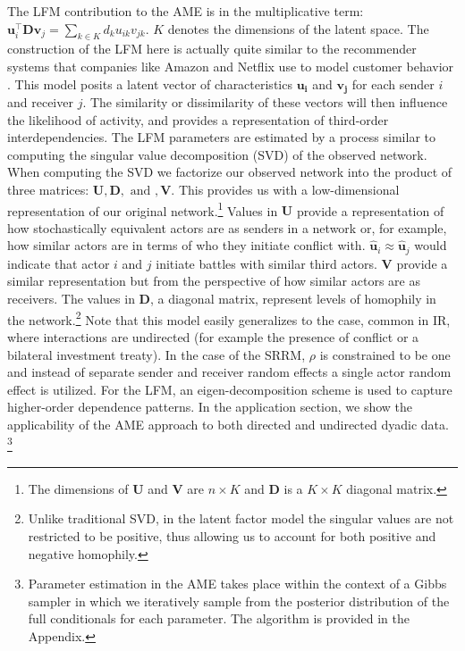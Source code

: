 The LFM contribution to the AME is in the multiplicative term: $\mathbf{u}_{i}^{\top} \mathbf{D} \mathbf{v}_{j}=\sum_{k \in K} d_{k} u_{ik} v_{jk}$. $K$ denotes the dimensions of the latent space. The construction of the LFM here is actually quite similar to the recommender systems that companies like Amazon and Netflix use to model customer behavior \citep{resnick:varian:1997,bennett:etal:2007}. This model posits a latent vector of characteristics $\mathbf{u_{i}}$ and $\mathbf{v_{j}}$ for each sender $i$ and receiver $j$. The similarity or dissimilarity of these vectors will then influence the likelihood of activity, and provides a representation of third-order interdependencies. The LFM parameters are estimated by a process similar to computing the singular value decomposition (SVD) of the observed network. When computing the SVD we factorize our observed network into the product of three matrices: $\mathbf{U}, \mathbf{D}, \text{ and }, \mathbf{V}$. This provides us with a low-dimensional representation of our original network.\footnote{The dimensions of $\mathbf{U}$ and $\mathbf{V}$ are $n \times K$ and $\mathbf{D}$ is a $K \times K$ diagonal matrix.} Values in $\mathbf{U}$ provide a representation of how stochastically equivalent actors are as senders in a network or, for example, how similar actors are in terms of who they initiate conflict with. $\hat{\mathbf{u}}_{i} \approx \hat{\mathbf{u}}_{j}$ would indicate that actor $i$ and $j$ initiate battles with similar third actors. $\mathbf{V}$ provide a similar representation but from the perspective of how similar actors are as receivers. The values in $\mathbf{D}$, a diagonal matrix, represent levels of homophily in the network.\footnote{Unlike traditional SVD, in the latent factor model the singular values are not restricted to be positive, thus allowing us to account for both positive and negative homophily.} Note that this model easily generalizes to the case, common in IR, where interactions are undirected (for example the presence of conflict or a bilateral investment treaty). In the case of the SRRM, $\rho$ is constrained to be one and instead of separate sender and receiver random effects a single actor random effect is utilized. For the LFM, an eigen-decomposition scheme is used to capture higher-order dependence patterns. In the application section, we show the applicability of the AME approach to both directed and undirected dyadic data. \footnote{Parameter estimation in the AME takes place within the context of a Gibbs sampler in which we iteratively sample from the posterior distribution of the full conditionals for each parameter. The algorithm is provided in the Appendix.} 

